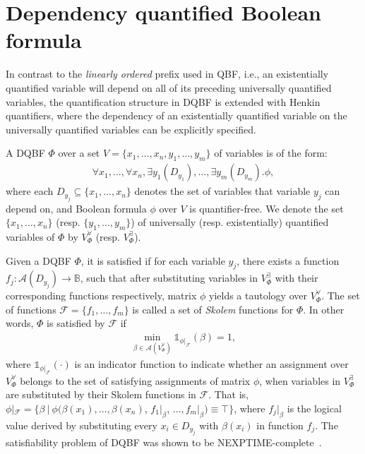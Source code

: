 \section{Dependency quantified Boolean formula}
\label{sect:dqbf}

In contrast to the \textit{linearly ordered} prefix used in QBF, i.e., an existentially quantified variable will depend on all of its preceding universally quantified variables,
the quantification structure in DQBF is extended with Henkin quantifiers,
where the dependency of an existentially quantified variable on the universally quantified variables can be explicitly specified.

A DQBF $\Phi$ over a set $V=\{x_1,\ldots,x_n,y_1,\ldots,y_m\}$ of variables is of the form:
\begin{align}
    \forall x_1, \ldots, \forall x_n, \exists y_1(D_{y_1}), \ldots, \exists y_m(D_{y_m}). \phi,
\end{align}
where each $D_{y_j}\subseteq \{x_1,\ldots,x_n\}$ denotes the set of variables that variable $y_j$ can depend on,
and Boolean formula $\phi$ over $V$ is quantifier-free.
We denote the set $\{x_1,\ldots,x_n\}$ (resp. $\{y_1,\ldots,y_m\}$) of universally (resp. existentially) quantified variables of $\Phi$ by $V_{\Phi}^\forall$ (resp. $V_{\Phi}^\exists$).

Given a DQBF $\Phi$, it is satisfied if for each variable $y_j$, there exists a function $f_j:\mathcal{A}(D_{y_j})\rightarrow \mathbb{B}$, such that after substituting variables in $V_{\Phi}^\exists$ with their corresponding functions respectively, matrix $\phi$ yields a tautology over $V_{\Phi}^\forall$.
The set of functions $\mathcal{F}=\{f_1,\ldots,f_m\}$ is called a set of \textit{Skolem} functions for $\Phi$.
In other words, $\Phi$ is satisfied by $\mathcal{F}$ if
\begin{align}\label{eq:dqbf-min}
    \min_{\beta \in \mathcal{A}(V_{\Phi}^{\forall})}\mathds{1}_{\phi|_{\mathcal{F}}}(\beta)=1,
\end{align}
where $\mathds{1}_{\phi|_{\mathcal{F}}}(\cdot)$ is an indicator function to indicate whether an assignment over $V_{\Phi}^{\forall}$ belongs to the set of satisfying assignments of matrix $\phi$,
when variables in $V_{\Phi}^{\exists}$ are substituted by their Skolem functions in $\mathcal{F}$.
That is, $\phi|_{\mathcal{F}} = \{\beta\ |\ \phi(\beta(x_1), \ldots, \beta(x_n)$, $f_1|_{\beta}$, $\ldots, f_m|_{\beta})\equiv \top\}$,
where $f_j|_{\beta}$ is the logical value derived by substituting every $x_i\in D_{y_j}$ with $\beta(x_i)$ in function $f_j$.
The satisfiability problem of DQBF was shown to be NEXPTIME-complete~\cite{Peterson2001}.